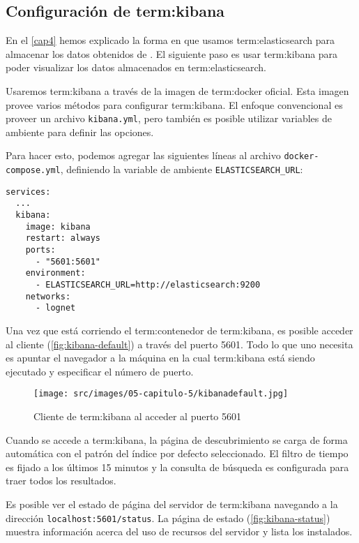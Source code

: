 \subsection{Configuración de \gls{term:kibana}}
\label{configuracion-de-kibana}

En el \autoref{cap4} hemos explicado la forma en que usamos \gls{term:elasticsearch} para
almacenar los datos obtenidos de . El siguiente paso es usar
\gls{term:kibana} para poder visualizar los datos almacenados en
\gls{term:elasticsearch}.

Usaremos \gls{term:kibana} a través de la imagen de \gls{term:docker} oficial.
Esta imagen provee varios métodos para configurar \gls{term:kibana}. El enfoque
convencional es proveer un archivo \texttt{kibana.yml}, pero también es
posible utilizar variables de ambiente para definir las opciones.

Para hacer esto, podemos agregar las siguientes líneas al archivo
\texttt{docker-compose.yml}, definiendo la variable de ambiente
\lstinline{ELASTICSEARCH_URL}:

\begin{lstlisting}
services:
  ...
  kibana:
    image: kibana
    restart: always
    ports:
      - "5601:5601"
    environment:
      - ELASTICSEARCH_URL=http://elasticsearch:9200
    networks:
      - lognet
\end{lstlisting}

Una vez que está corriendo el \gls{term:contenedor} de \gls{term:kibana}, es posible acceder al
cliente  (\autoref{fig:kibana-default}) a través
del puerto 5601. Todo lo que uno necesita es apuntar el navegador  a la
máquina en la cual \gls{term:kibana} está siendo ejecutado y especificar el
número de puerto.

\begin{figure}
  \texttt{[image: src/images/05-capitulo-5/kibanadefault.jpg]}
  \caption{Cliente de \gls{term:kibana} al acceder al puerto 5601}
  \label{fig:kibana-default}
\end{figure}

Cuando se accede a \gls{term:kibana}, la página de descubrimiento se carga de
forma automática con el patrón del índice por defecto seleccionado. El filtro
de tiempo es fijado a los últimos 15 minutos y la consulta de búsqueda es
configurada para traer todos los resultados.

Es posible ver el estado de página del servidor de \gls{term:kibana}
navegando a la dirección \lstinline{localhost:5601/status}. La página de estado
(\autoref{fig:kibana-status}) muestra información acerca del uso de recursos
del servidor y lista los  instalados.

